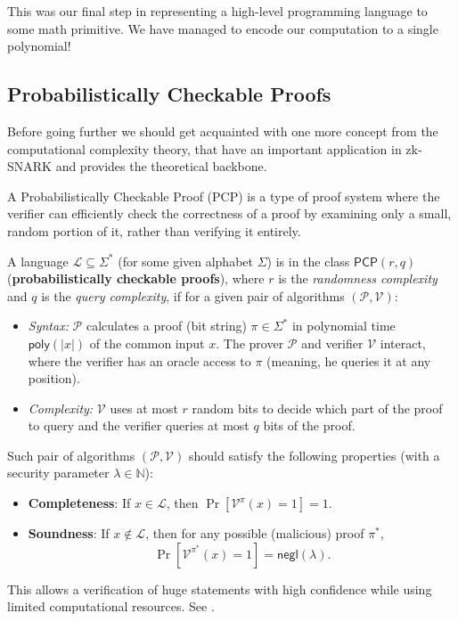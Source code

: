 \documentclass[../lecture-notes-148x210.tex]{subfiles}
\begin{document}
This was our final step in representing a high-level programming language to some math primitive.
We have managed to encode our computation to a single polynomial!

\subsection{Probabilistically Checkable Proofs}

Before going further we should get acquainted with one more concept from the computational 
complexity theory, that have an important application in zk-SNARK and provides the theoretical 
backbone. 

A Probabilistically Checkable Proof (PCP) is a type of proof system where the verifier can 
efficiently check the correctness of a proof by examining only a small, random portion of it, rather
than verifying it entirely. 
\begin{definition}
    A language $\mathcal{L} \subseteq \Sigma^*$ (for some given alphabet $\Sigma$) is in the class $\mathsf{PCP}(r,q)$ (\textbf{probabilistically checkable proofs}), 
    where $r$ is the \emph{randomness complexity} and $q$ is the \emph{query complexity}, 
    if for a given pair of algorithms $(\mathcal{P}, \mathcal{V})$: 
    \begin{itemize}
        \item \emph{Syntax:} $\mathcal{P}$ calculates a proof (bit string) $\pi \in \Sigma^*$ in polynomial time $\mathsf{poly}(|x|)$ of the common input $x$. The prover $\mathcal{P}$ and verifier $\mathcal{V}$ interact, where the verifier has an oracle access to $\pi$ (meaning, he queries it at any position).
        \item \emph{Complexity:} $\mathcal{V}$ uses at most $r$ random bits to decide which part of the proof to 
        query and the verifier queries at most $q$ bits of the proof.
    \end{itemize}
    
    Such pair of algorithms $(\mathcal{P}, \mathcal{V})$ should satisfy the following properties (with a security parameter $\lambda \in \mathbb{N}$):
    \begin{itemize}
        \item \textbf{Completeness}: If $x \in \mathcal{L}$, then $\Pr[\mathcal{V}^{\pi}(x) = 1] = 1$.
        \item \textbf{Soundness}: If $x \notin \mathcal{L}$, then for any possible (malicious) proof $\pi^*$, 
        \begin{equation*}
            \Pr[\mathcal{V}^{\pi^*}(x) = 1] = \mathsf{negl}(\lambda).
        \end{equation*}
    \end{itemize}
\end{definition}
This allows a verification of huge statements with high confidence while using limited computational
resources. See .
\end{document}
